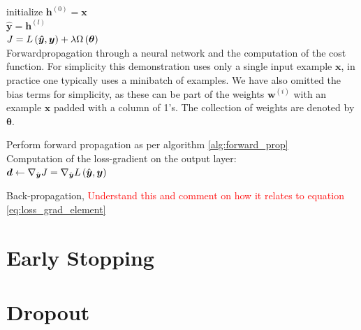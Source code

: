 \begin{algorithm}\label{alg:forward_prop}
\SetAlgoLined
{}
 initialize $\boldsymbol{h}^{(0)} = \boldsymbol{x}$ \\
$\hat{\boldsymbol{y}} = \boldsymbol{h}^{(l)}$ \\
$J = L\left (\boldsymbol{\hat{y}}, \boldsymbol{y}\right) + \lambda \Omega \left (\boldsymbol{\theta}\right)$ \\
 \caption{Forwardpropagation through a neural network and the computation of the cost function. For simplicity this demonstration uses only a single input example $\boldsymbol{x}$, in practice one typically uses a minibatch of examples. We have also omitted the bias terms for simplicity, as these can be part of the weights $\boldsymbol{w}^{(i)}$ with an example $\boldsymbol{x}$ padded with a column of 1's. The collection of weights are denoted by $\boldsymbol{\theta}$.}
\end{algorithm}

\begin{algorithm}\label{alg:back_prop}
\SetAlgoLined
{}
Perform forward propagation as per algorithm \ref{alg:forward_prop}\\
Computation of the loss-gradient on the output layer:\\
$\boldsymbol{d} \leftarrow \nabla_{\hat{\boldsymbol{y}}} J =  \nabla_{\hat{\boldsymbol{y}}} L\left (\hat{\boldsymbol{y}}, \boldsymbol{y}\right)$ \\
\caption{Back-propagation, \textcolor{red}{Understand this and comment on how it relates to equation \ref{eq:loss_grad_element}}}
\end{algorithm}

\section{Early Stopping} \label{sec:early_stopping}

\section{Dropout} \label{sec:Dropout}